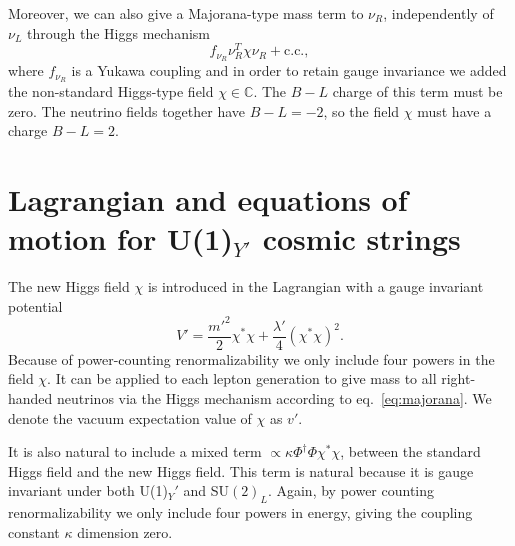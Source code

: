 Moreover, we can also give a Majorana-type mass term to $\nu_R$, in\-de\-pend\-ent\-ly of $\nu_L$ through the Higgs mechanism 
\begin{equation}
\label{eq:majorana}
f_{\nu_R} \nu_R^T \chi \nu_R + \text{c.c.},
\end{equation}
where $f_{\nu_R}$ is a Yukawa coupling and in order to retain gauge invariance we added the non-standard Higgs-type field $\chi\in\mathbb{C}$.
The $B-L$ charge of this term must be zero. The neutrino fields together have $B-L = -2$, so the field $\chi$ must have a charge $B-L=2$.

\section{Lagrangian and equations of motion for U(1)$_{Y'}$ cosmic strings} 

The new Higgs field $\chi$ is introduced in the Lagrangian with a gauge invariant potential 
\begin{equation}
V' = \frac{m'^{2}}{2}\chi^*\chi+\frac{\lambda'}{4}(\chi^*\chi)^2.
\end{equation}
Because of power-counting renormalizability we only include four powers in the field $\chi$.
It can be applied to each lepton generation to give mass to all right-handed neutrinos via the Higgs mechanism according to eq.\ \eqref{eq:majorana}. We denote the vacuum expectation value of $\chi$ as $v'$.

It is also natural to include a mixed term $\propto \kappa\Phi^{\dagger}\Phi\chi^*\chi$, between the standard Higgs field and the new Higgs field. This term is natural because it is gauge invariant under both U(1)$_Y'$ and SU$(2)_L$. Again, by power counting renormalizability we only include four powers in energy, giving the coupling constant $\kappa$ dimension zero.

